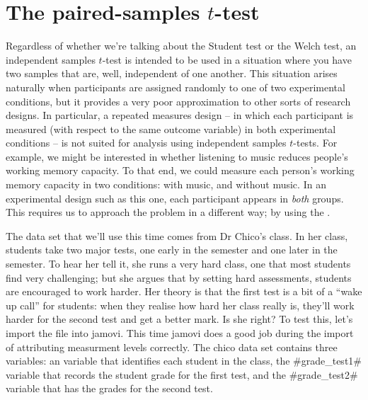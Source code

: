 \vspace*{12pt}


\section{The paired-samples $t$-test~\label{sec:pairedsamplesttest}}

Regardless of whether we're talking about the Student test or the Welch test, an independent samples $t$-test is intended to be used in a situation where you have two samples that are, well, independent of one another. This situation arises naturally when participants are assigned randomly to one of two experimental conditions, but it provides a very poor approximation to other sorts of research designs. In particular, a repeated measures design -- in which each participant is measured (with respect to the same outcome variable) in both experimental conditions -- is not suited for analysis using independent samples $t$-tests. For example, we might be interested in whether listening to music reduces people's working memory capacity. To that end, we could measure each person's working memory capacity in two conditions: with music, and without music. In an experimental design such as this one, each participant appears in {\it both} groups. This requires us to approach the problem in a different way; by using the . 


The data set that we'll use this time comes from Dr Chico's class. In her class, students take two major tests, one early in the semester and one later in the semester. To hear her tell it, she runs a very hard class, one that most students find very challenging; but she argues that by setting hard assessments, students are encouraged to work harder. Her theory is that the first test is a bit of a ``wake up call'' for students: when they realise how hard her class really is, they'll work harder for the second test and get a better mark. Is she right? To test this, let's import the  file into jamovi. This time jamovi does a good job during the import of attributing measurment levels correctly. The chico data set contains three variables: an  variable that identifies each student in the class, the \rtextverb#grade_test1# variable that records the student grade for the first test, and the \rtextverb#grade_test2# variable that has the grades for the second test. 

